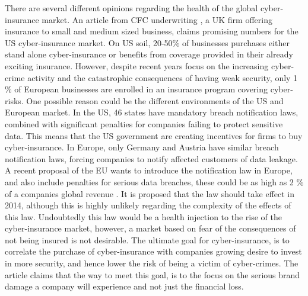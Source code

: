 There are several different opinions regarding the health of the global cyber-insurance market. 
An article from CFC underwriting \cite{CFCunder}, a UK firm offering insurance to small 
and medium sized business, claims promising numbers for the US cyber-insurance market. 
On US soil, 20-50$\%$ of businesses purchases either stand alone cyber-insurance or benefits from
 coverage provided in their already exciting insurance. However, despite recent years focus on the increasing
  cyber-crime activity and the catastrophic consequences of having weak security, 
  only 1$\%$ of European businesses are enrolled in an insurance program covering cyber-risks. 
One possible reason could be the different environments of the US and European market. 
In the US, 46 states have mandatory breach notification laws, combined with significant penalties 
for companies failing to protect sensitive data. This means that the US government are creating incentives for firms to buy cyber-insurance.
 In Europe, only Germany and Austria have similar breach notification laws,
 forcing companies to notify affected customers of data leakage. A recent proposal of the EU wants to introduce the notification law in Europe, and also include penalties for serious data breaches, these could be as high as 2 $\%$ of a companies global revenue \cite{CFCunder}. It is proposed that the law should take effect in 2014, although this is highly unlikely regarding the complexity of the effects of this law. Undoubtedly this law would be a health injection to the rise of the cyber-insurance market, however, a market based on fear of the consequences of not being insured is not desirable. The ultimate goal for cyber-insurance, is to correlate the purchase of cyber-insurance with companies growing desire to invest in more security, and hence lower the risk of being a victim of cyber-crimes. 
The article claims that the way to meet this goal, is to the focus on the serious brand damage a company will experience and not just the financial loss. 


   
   
   
   
   
   
   
   
   
   
   
   
   
   
  

